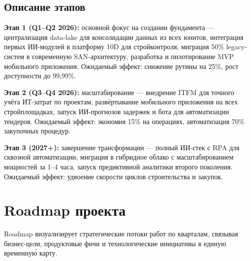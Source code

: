 \documentclass[12pt,a4paper]{article}
\begin{document}
\subsection{Описание этапов}

\textbf{Этап 1 (Q1--Q2 2026):} основной фокус на создании фундамента --- централизация data-lake для консолидации данных из всех юнитов, интеграция первых ИИ-модулей в платформу 10D для стройконтроля, миграция 50\% legacy-систем в современную SAN-архитектуру, разработка и пилотирование MVP мобильного приложения. Ожидаемый эффект: снижение рутины на 25\%, рост доступности до 99,99\%.

\textbf{Этап 2 (Q3--Q4 2026):} масштабирование --- внедрение ITFM для точного учёта ИТ-затрат по проектам, развёртывание мобильного приложения на всех стройплощадках, запуск ИИ-прогнозов задержек и бота для автоматизации тендеров. Ожидаемый эффект: экономия 15\% на операциях, автоматизация 70\% закупочных процедур.

\textbf{Этап 3 (2027+):} завершение трансформации --- полный ИИ-стек с RPA для сквозной автоматизации, миграция в гибридное облако с масштабированием мощностей за 1--4 часа, запуск предиктивной аналитики второго поколения. Ожидаемый эффект: удвоение скорости циклов строительства и закупок.

\newpage

\section{Roadmap проекта}

Roadmap визуализирует стратегические потоки работ по кварталам, связывая бизнес-цели, продуктовые фичи и технологические инициативы в единую временну\'{ю} карту.
\end{document}

